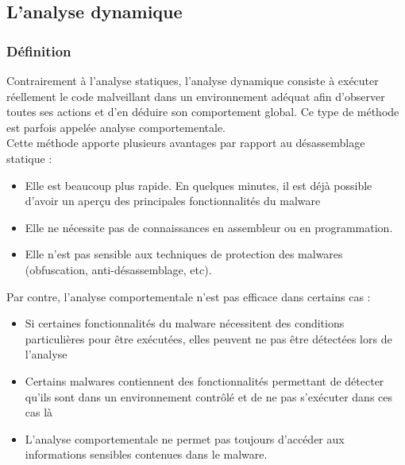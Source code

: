 \subsection{L'analyse dynamique}
\subsubsection{Définition}
Contrairement à l'analyse statiques, l'analyse dynamique consiste à exécuter réellement le code malveillant dans un environnement adéquat afin d'observer toutes ses actions et d'en déduire son comportement global. Ce type de méthode est parfois appelée analyse comportementale.\\


Cette méthode apporte plusieurs avantages par rapport au désassemblage statique :
\begin{itemize}
\item Elle est beaucoup plus rapide. En quelques minutes, il est déjà possible d'avoir un aperçu des principales fonctionnalités du malware
\item Elle ne nécessite pas de connaissances en assembleur ou en programmation.
\item Elle n'est pas sensible aux techniques de protection des malwares (obfuscation, anti-désassemblage, etc).\\
\end{itemize}

Par contre, l'analyse comportementale n'est pas efficace dans certains cas :
\begin{itemize}

\item Si certaines fonctionnalités du malware nécessitent des conditions particulières pour être exécutées, elles peuvent ne pas être détectées lors de l'analyse
\item Certains malwares contiennent des fonctionnalités permettant de détecter qu'ils sont dans un environnement contrôlé et de ne pas s'exécuter dans ces cas là
\item L'analyse comportementale ne permet pas toujours d'accéder aux informations sensibles contenues dans le malware.
\end{itemize}
